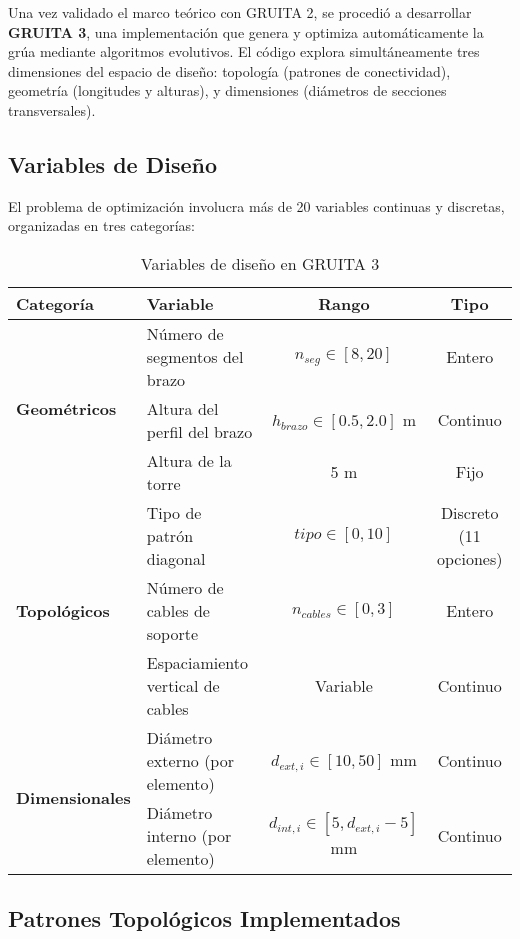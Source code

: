\documentclass[10pt,a4paper]{article}
\begin{document}
Una vez validado el marco teórico con GRUITA 2, se procedió a desarrollar \textbf{GRUITA 3}, una implementación que genera y optimiza automáticamente la grúa mediante algoritmos evolutivos. El código explora simultáneamente tres dimensiones del espacio de diseño: topología (patrones de conectividad), geometría (longitudes y alturas), y dimensiones (diámetros de secciones transversales).

\subsection{Variables de Diseño}

El problema de optimización involucra más de 20 variables continuas y discretas, organizadas en tres categorías:

\begin{table}[H]
\small
\centering
\caption{Variables de diseño en GRUITA 3}
\begin{tabular}{llcc}
\toprule
\textbf{Categoría} & \textbf{Variable} & \textbf{Rango} & \textbf{Tipo} \\
\midrule
\multirow{3}{*}{\textbf{Geométricos}}
& Número de segmentos del brazo & $n_{seg} \in [8, 20]$ & Entero \\
& Altura del perfil del brazo & $h_{brazo} \in [0.5, 2.0]$ m & Continuo \\
& Altura de la torre & 5 m & Fijo \\
\midrule
\multirow{3}{*}{\textbf{Topológicos}}
& Tipo de patrón diagonal & $tipo \in [0, 10]$ & Discreto (11 opciones) \\
& Número de cables de soporte & $n_{cables} \in [0, 3]$ & Entero \\
& Espaciamiento vertical de cables & Variable & Continuo \\
\midrule
\multirow{2}{*}{\textbf{Dimensionales}}
& Diámetro externo (por elemento) & $d_{ext,i} \in [10, 50]$ mm & Continuo \\
& Diámetro interno (por elemento) & $d_{int,i} \in [5, d_{ext,i}-5]$ mm & Continuo \\
\bottomrule
\end{tabular}
\end{table}

\subsection{Patrones Topológicos Implementados}
\end{document}
